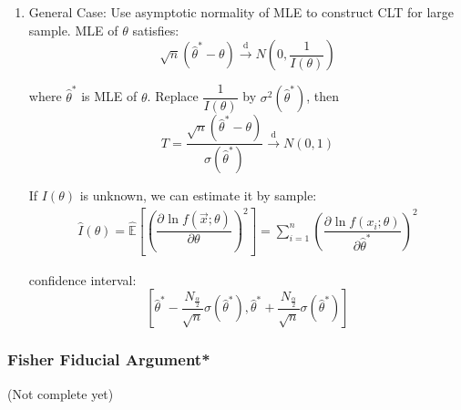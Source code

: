 \begin{enumerate}

    
    \item General Case: Use asymptotic normality of MLE to construct CLT for large sample. MLE of $\theta$ satisfies:
    \begin{equation}
        \sqrt{n}(\hat{\theta}^*-\theta)\xrightarrow[]{\mathrm{d}}N(0,\frac{1}{I(\theta )})
    \end{equation}

    where $\hat{\theta}^*$ is MLE of $\theta$. Replace $\dfrac{1}{I(\theta)}$ by $\sigma^2(\hat{\theta}^*)$, then
    \begin{equation}
        T=\frac{\sqrt{n}(\hat{\theta}^*-\theta)}{\sigma(\hat{\theta}^*)}\xrightarrow[]{\mathrm{d}}N(0,1)    
    \end{equation}

    If $ I(\theta ) $ is unknown, we can estimate it by sample:
    \begin{align}
        \hat{I}(\theta )=\hat{\mathbb{E}}\left[\left(\dfrac{\partial^{} \ln f(\vec{x};\theta )}{\partial \theta ^{}}\right)^2\right]=\sum_{i=1}^n \left(\dfrac{\partial^{} \ln f(x_i;\theta )}{\partial \hat{\theta}^*}\right)^2
    \end{align}

    confidence interval:
    \begin{equation}
        \left[\hat{\theta}^*-\frac{N_{\frac{\alpha}{2}}}{\sqrt{n}}\sigma(\hat{\theta}^*),\hat{\theta}^*+\frac{N_{\frac{\alpha}{2}}}{\sqrt{n}}\sigma(\hat{\theta}^*)\right]
    \end{equation}
    \end{enumerate}


\subsubsection{Fisher Fiducial Argument*}\label{SubSectionFisherFiducialArgument}
    (Not complete yet)


